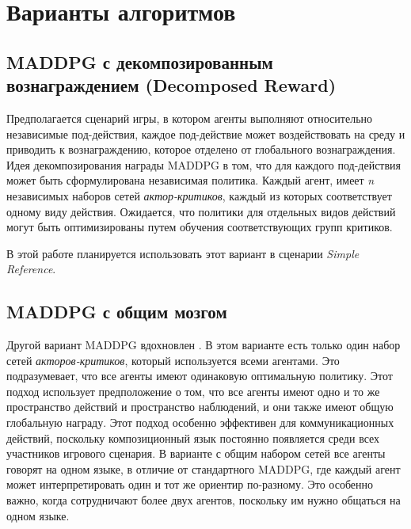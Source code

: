 \section{Варианты алгоритмов}

\subsection{MADDPG с декомпозированным вознаграждением (Decomposed Reward)}

Предполагается сценарий игры, в котором агенты выполняют относительно независимые под-действия, каждое под-действие может воздействовать на среду и приводить к вознаграждению, которое отделено от глобального вознаграждения. Идея декомпозирования награды MADDPG в том, что для каждого под-действия может быть сформулирована независимая политика. Каждый агент, имеет \textit{n} независимых наборов сетей \textit{актор-критиков}, каждый из которых соответствует одному виду действия. Ожидается, что политики для отдельных видов действий могут быть оптимизированы путем обучения соответствующих групп критиков.

В этой работе планируется использовать этот вариант в сценарии \textit{Simple Reference}.

\subsection{MADDPG с общим мозгом}

Другой вариант MADDPG вдохновлен \cite{mordatch2017emergence}. В этом варианте есть только один набор сетей \textit{акторов-критиков}, который используется всеми агентами. Это подразумевает, что все агенты имеют одинаковую оптимальную политику. Этот подход использует предположение о том, что все агенты имеют одно и то же пространство действий и пространство наблюдений, и они также имеют общую глобальную награду. Этот подход особенно эффективен для коммуникационных действий, поскольку композиционный язык постоянно появляется среди всех участников игрового сценария. В варианте с общим набором сетей все агенты говорят на одном языке, в отличие от стандартного MADDPG, где каждый агент может интерпретировать один и тот же ориентир по-разному. Это особенно важно, когда сотрудничают более двух агентов, поскольку им нужно общаться на одном языке.
